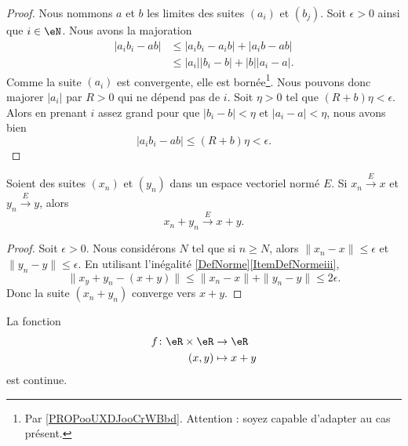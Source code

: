 \begin{proof}
	Nous nommons \( a\) et \( b\) les limites des suites \( (a_i)\) et \( (b_j)\). Soit \( \epsilon>0\) ainsi que \( i\in \eN\). Nous avons la majoration
	\begin{subequations}
		\begin{align}
			| a_ib_i-ab | & \leq | a_ib_i-a_ib |  + | a_ib-ab |      \\
			              & \leq | a_i | |b_i-b | + | b | | a_i-a |.
		\end{align}
	\end{subequations}
	Comme la suite \( (a_i)\) est convergente, elle est bornée\footnote{Par \ref{PROPooUXDJooCrWBbd}. Attention : soyez capable d'adapter au cas présent.}. Nous pouvons donc majorer \( | a_i |\) par \( R>0\) qui ne dépend pas de \( i\). Soit \( \eta>0\) tel que \( (R+b)\eta<\epsilon\). Alors en prenant \( i\) assez grand pour que \( | b_i-b |<\eta\) et \( | a_i-a |<\eta\), nous avons bien
	\begin{equation}
		| a_ib_i-ab |\leq (R+b)\eta<\epsilon.
	\end{equation}
\end{proof}

\begin{proposition}     \label{PROPooICZMooGfLdPc}
	Soient des suites \( (x_n)\) et \( (y_n)\) dans un espace vectoriel normé \( E\). Si \( x_n\stackrel{E}{\longrightarrow}x\) et \( y_n\stackrel{E}{\longrightarrow}y\), alors
	\begin{equation}
		x_n+y_n\stackrel{E}{\longrightarrow}x+y.
	\end{equation}
\end{proposition}

\begin{proof}
	Soit \( \epsilon>0\). Nous considérons \( N\) tel que si \( n\geq N\), alors \( \| x_n-x \|\leq \epsilon\) et \( \| y_n-y \|\leq \epsilon\). En utilisant l'inégalité \ref{DefNorme}\ref{ItemDefNormeiii},
	\begin{equation}
		\| x_y+y_n-(x+y) \|\leq \| x_n-x \|+\| y_n-y \|\leq 2\epsilon.
	\end{equation}
	Donc la suite \( (x_n+y_n)\) converge vers \( x+y\).
\end{proof}

\begin{lemma}       \label{LEMooGKIPooWgpFTB}
	La fonction
	\begin{equation}
		\begin{aligned}
			f\colon \eR\times \eR & \to \eR     \\
			(x,y)                 & \mapsto x+y
		\end{aligned}
	\end{equation}
	est continue.
\end{lemma}

